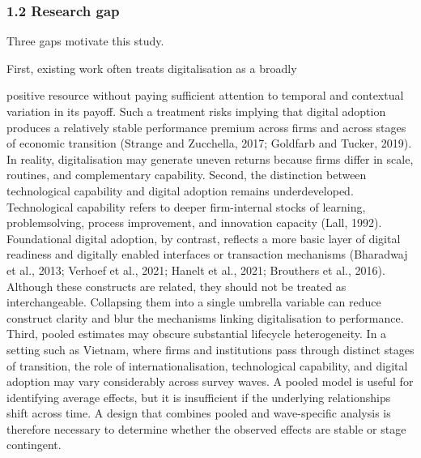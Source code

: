 \documentclass[12pt,a4paper]{article}
\begin{document}
\hypertarget{12-research-gap}{%
\subsubsection{1.2 Research gap}\label{12-research-gap}}

Three gaps motivate this study.

First, existing work often treats digitalisation as a broadly

positive resource without paying sufficient attention to temporal and
contextual variation in its payoff. Such a treatment risks implying that
digital adoption produces a relatively stable performance premium across
firms and across stages of economic transition (Strange and Zucchella,
2017; Goldfarb and Tucker, 2019). In reality, digitalisation may
generate uneven returns because firms differ in scale, routines, and
complementary capability. Second, the distinction between technological
capability and digital adoption remains underdeveloped. Technological
capability refers to deeper firm-internal stocks of learning,
problemsolving, process improvement, and innovation capacity (Lall,
1992). Foundational digital adoption, by contrast, reflects a more basic
layer of digital readiness and digitally enabled interfaces or
transaction mechanisms (Bharadwaj et al., 2013; Verhoef et al., 2021;
Hanelt et al., 2021; Brouthers et al., 2016). Although these constructs
are related, they should not be treated as interchangeable. Collapsing
them into a single umbrella variable can reduce construct clarity and
blur the mechanisms linking digitalisation to performance. Third, pooled
estimates may obscure substantial lifecycle heterogeneity. In a setting
such as Vietnam, where firms and institutions pass through distinct
stages of transition, the role of internationalisation, technological
capability, and digital adoption may vary considerably across survey
waves. A pooled model is useful for identifying average effects, but it
is insufficient if the underlying relationships shift across time. A
design that combines pooled and wave-specific analysis is therefore
necessary to determine whether the observed effects are stable or stage
contingent.
\end{document}
